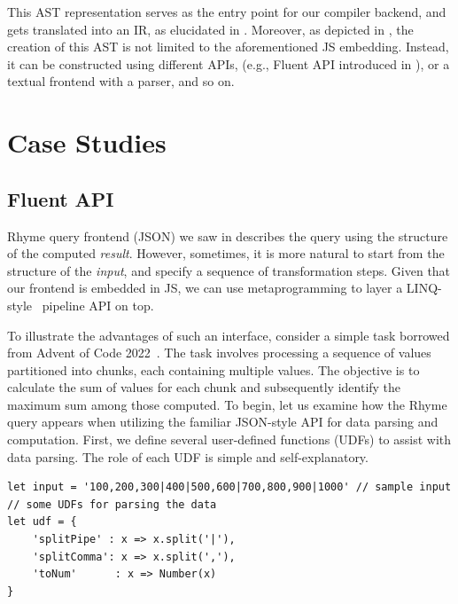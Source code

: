 \documentclass[runningheads]{llncs}
\newcommand{\lang}{Rhyme}
\begin{document}
This AST representation serves as the entry point for our compiler backend, and gets
translated into an IR, as elucidated in .
Moreover, as depicted in , the creation of this AST is not
limited to the aforementioned JS embedding.
Instead, it can be constructed using different APIs, (e.g., Fluent API introduced in ),
or a textual frontend with a parser, and so on.

\section{Case Studies}\label{sec:case_studies}
\subsection{Fluent API}\label{subsec:fluent}
\lang{} query frontend (JSON) we saw in  describes the query
using the structure of the computed \emph{result}.
However, sometimes, it is more natural to start from the structure of the 
\emph{input}, and specify a sequence of transformation steps.
Given that our frontend is embedded in JS, we can use metaprogramming to
layer a LINQ-style~\cite{linq_sigmod} pipeline API on top.

To illustrate the advantages of such an interface, consider a
simple task borrowed from Advent of Code 2022~\cite{adventofcode22}.
The task involves processing a sequence of values partitioned into chunks,
each containing multiple values.
The objective is to calculate the sum of values for each chunk and
subsequently identify the maximum sum among those computed.
To begin, let us examine how the \lang{} query appears when utilizing
the familiar JSON-style API for data parsing and computation.
First, we define several user-defined functions (UDFs) to assist with data parsing.
The role of each UDF is simple and self-explanatory.

\begin{lstlisting}[style=JavaScript, columns=flexible]
let input = '100,200,300|400|500,600|700,800,900|1000' // sample input
// some UDFs for parsing the data
let udf = {
    'splitPipe' : x => x.split('|'),
    'splitComma': x => x.split(','),
    'toNum'      : x => Number(x)
}
\end{lstlisting}
\end{document}
